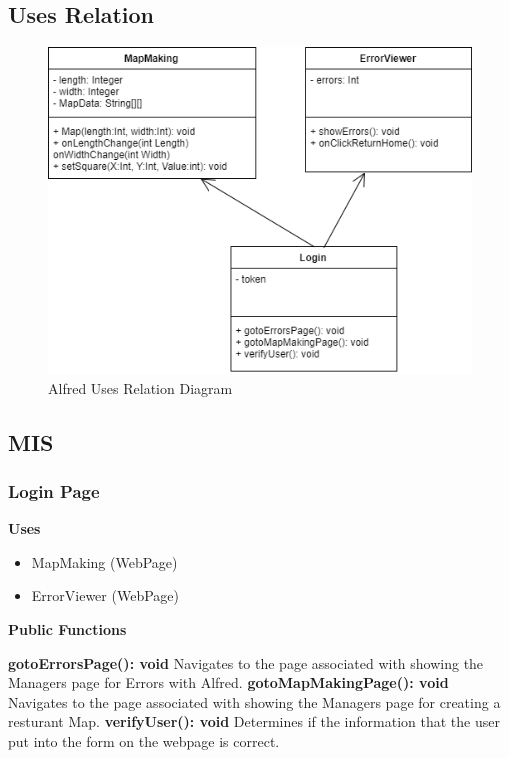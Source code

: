\documentclass [10pt]{article}
\begin{document}
\subsection{Uses Relation}
\begin{figure} [h!]
	\centering
	\includegraphics [scale = 0.4] {figures/Manager_UsesDiagram.png}
	\caption{Alfred Uses Relation Diagram}
\end{figure}

\subsection{MIS}

\subsubsection{Login Page}
\textbf{Uses}
\begin{itemize}
	\item MapMaking (WebPage)
	\item ErrorViewer (WebPage)
\end{itemize}



\textbf{Public Functions}

\textbf{gotoErrorsPage(): void}
Navigates to the page associated with showing the Managers page for Errors with Alfred.
\textbf{gotoMapMakingPage(): void}
Navigates to the page associated with showing the Managers page for creating a resturant Map.
\textbf{verifyUser(): void}
Determines if the information that the user put into the form on the webpage is correct.
\end{document}
